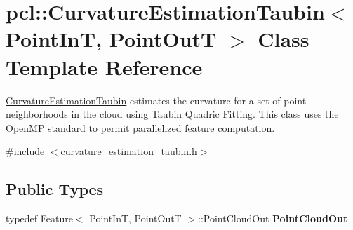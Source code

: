 \hypertarget{classpcl_1_1_curvature_estimation_taubin}{\section{pcl\-:\-:\-Curvature\-Estimation\-Taubin$<$ \-Point\-In\-T, \-Point\-Out\-T $>$ \-Class \-Template \-Reference}
\label{classpcl_1_1_curvature_estimation_taubin}
}


\hyperlink{classpcl_1_1_curvature_estimation_taubin}{\-Curvature\-Estimation\-Taubin} estimates the curvature for a set of point neighborhoods in the cloud using \-Taubin \-Quadric \-Fitting. \-This class uses the \-Open\-M\-P standard to permit parallelized feature computation.  




{\ttfamily \#include $<$curvature\-\_\-estimation\-\_\-taubin.\-h$>$}

\subsection*{\-Public \-Types}
\begin{DoxyCompactItemize}
\item 
\hypertarget{classpcl_1_1_curvature_estimation_taubin_a02fd316e3ed7dfcacb1e0e7d388235e8}{typedef \-Feature$<$ \-Point\-In\-T, \*
\-Point\-Out\-T $>$\-::\-Point\-Cloud\-Out {\bfseries \-Point\-Cloud\-Out}}\label{classpcl_1_1_curvature_estimation_taubin_a02fd316e3ed7dfcacb1e0e7d388235e8}

\end{DoxyCompactItemize}
